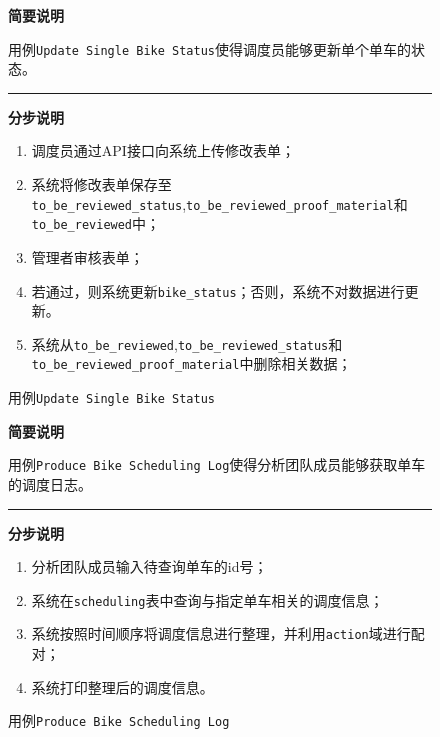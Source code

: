 \begin{figure}
    \centering
 \begin{mdframed}[leftmargin=0pt, rightmargin=0pt]
    \textbf{简要说明}

    用例\texttt{Update Single Bike Status}使得调度员能够更新单个单车的状态。

\noindent\rule{\textwidth}{0.5pt} %
    \textbf{分步说明}

    \begin{enumerate}
        \item 调度员通过API接口向系统上传修改表单；
        \item 系统将修改表单保存至\texttt{to\_be\_reviewed\_status},\texttt{to\_be\_reviewed\_proof\_material}和\texttt{to\_be\_reviewed}中；
        \item 管理者审核表单；
        \item 若通过，则系统更新\texttt{bike\_status}；否则，系统不对数据进行更新。
        \item 系统从\texttt{to\_be\_reviewed},\texttt{to\_be\_reviewed\_status}和\texttt{to\_be\_reviewed\_proof\_material}中删除相关数据；
    \end{enumerate}
\end{mdframed}   
\caption{用例\texttt{Update Single Bike Status}}\label{UpdateSingleBikeStatus}
\end{figure}

\begin{figure}
    \centering
 \begin{mdframed}[leftmargin=0pt, rightmargin=0pt]
    \textbf{简要说明}

    用例\texttt{Produce Bike Scheduling Log}使得分析团队成员能够获取单车的调度日志。

\noindent\rule{\textwidth}{0.5pt} %
    \textbf{分步说明}

    \begin{enumerate}
        \item 分析团队成员输入待查询单车的id号；
        \item 系统在\texttt{scheduling}表中查询与指定单车相关的调度信息；
        \item 系统按照时间顺序将调度信息进行整理，并利用\texttt{action}域进行配对；
        \item 系统打印整理后的调度信息。
    \end{enumerate}
\end{mdframed}   
\caption{用例\texttt{Produce Bike Scheduling Log}}\label{ProduceBikeSchedulingLog}
\end{figure}

